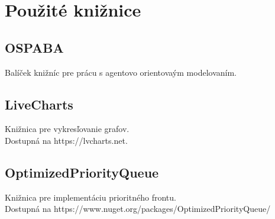 \documentclass[letterpaper]{article}
\let\stdsection\section							%
\renewcommand\section{\newpage\stdsection}		%
\begin{document}
	\section{Použité knižnice}
	
	\subsection*{OSPABA}
	
	\noindent Balíček knižníc pre prácu s agentovo orientovaým modelovaním.
	
	\subsection*{LiveCharts}
	
	\noindent Knižnica pre vykresľovanie grafov. \\
	Dostupná na https://lvcharts.net.
	
	\subsection*{OptimizedPriorityQueue}
	
	\noindent Knižnica pre implementáciu prioritného frontu. \\ 
	Dostupná na https://www.nuget.org/packages/OptimizedPriorityQueue/
	
\end{document}

